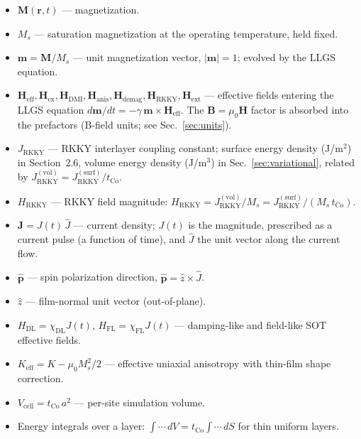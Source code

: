 \documentclass[11pt,a4paper]{article}
\newcommand{\mb}[1]{\mathbf{#1}}
\newcommand{\phat}{\hat{\mb{p}}}
\newcommand{\zhat}{\hat{z}}
\newcommand{\Heff}{\mb{H}_{\text{eff}}}
\newcommand{\Hex}{\mb{H}_{\text{ex}}}
\newcommand{\Hdmi}{\mb{H}_{\text{DMI}}}
\newcommand{\Hanis}{\mb{H}_{\text{anis}}}
\newcommand{\Hdemag}{\mb{H}_{\text{demag}}}
\newcommand{\Hrkky}{\mb{H}_{\text{RKKY}}}
\newcommand{\Hext}{\mb{H}_{\text{ext}}}
\newcommand{\tCo}{t_{\text{Co}}}
\newcommand{\Keff}{K_{\text{eff}}}
\newcommand{\Ms}{M_s}
\begin{document}
\begin{itemize}[leftmargin=2em]
    \item $\mb{M}(\mb{r}, t)$ --- magnetization.
    \item $\Ms$ --- saturation magnetization at the operating
        temperature, held fixed.
    \item $\mb{m} = \mb{M}/\Ms$ --- unit magnetization vector,
        $|\mb{m}| = 1$; evolved by the LLGS equation.
    \item $\Heff, \Hex, \Hdmi, \Hanis, \Hdemag, \Hrkky, \Hext$ ---
        effective fields entering the LLGS equation
        $d\mb{m}/dt = -\gamma\,\mb{m}\times\Heff$. The
        $\mb{B}=\mu_0\mb{H}$ factor is absorbed into the prefactors
        (B-field units; see Sec.~\ref{sec:units}).
    \item $J_{\text{RKKY}}$ --- RKKY interlayer coupling constant;
        surface energy density (J/m$^2$) in Section~2.6, volume
        energy density (J/m$^3$) in Sec.~\ref{sec:variational},
        related by $J_{\text{RKKY}}^{(\text{vol})}
        = J_{\text{RKKY}}^{(\text{surf})}/\tCo$.
    \item $H_{\text{RKKY}}$ --- RKKY field magnitude:
        $H_{\text{RKKY}} = J_{\text{RKKY}}^{(\text{vol})}/\Ms
        = J_{\text{RKKY}}^{(\text{surf})}/(\Ms\,\tCo)$.
    \item $\mb{J} = J(t)\,\hat{J}$ --- current density;
        $J(t)$ is the magnitude, prescribed as a current pulse
        (a function of time), and $\hat{J}$ the unit vector along
        the current flow.
    \item $\phat$ --- spin polarization direction,
        $\phat = \zhat \times \hat{J}$.
    \item $\zhat$ --- film-normal unit vector (out-of-plane).
    \item $H_{\text{DL}} = \chi_{\text{DL}} J(t)$,
        $H_{\text{FL}} = \chi_{\text{FL}} J(t)$ --- damping-like and
        field-like SOT effective fields.
    \item $\Keff = K - \mu_0 \Ms^2 / 2$ --- effective uniaxial
        anisotropy with thin-film shape correction.
    \item $V_{\text{cell}} = \tCo\,a^2$ --- per-site simulation
        volume.
    \item Energy integrals over a layer:
        $\int \cdots\,dV = \tCo \int \cdots\,dS$ for thin uniform
        layers.
\end{itemize}

\end{document}
